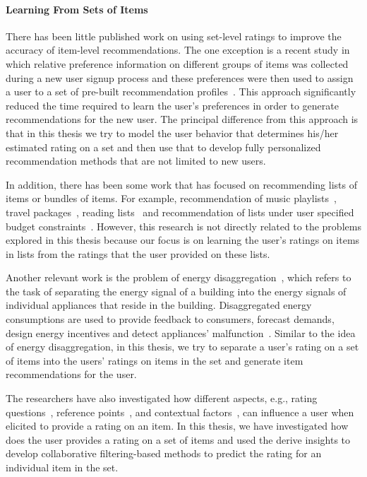 \paragraph{Learning From Sets of Items}
There has been little published work on using set-level ratings to improve the
accuracy of item-level recommendations. The one exception is a recent study in which relative
preference information on different groups of items was collected during a new user
signup process and these preferences were then used to assign a user to a set of
pre-built recommendation profiles~\cite{r53}. 
This approach significantly reduced the time required to learn the user's
preferences in order to generate recommendations for the new user.
The principal difference from this 
approach is that in this thesis we try to model the user behavior that determines
his/her estimated rating on a set and then use that to develop fully
personalized recommendation methods that are not limited to new users.

In addition, there has been some work that  has focused on recommending
lists of items or bundles of items. For example, recommendation of music
playlists~\cite{r55,moore2012learning,aizenberg2012build}, travel
packages~\cite{interdonato2013versatile,r54,liu2011personalized,xie2011comprec}, reading
lists~\cite{r56} and recommendation of lists under user specified budget
constraints~\cite{xie2010breaking,BenouaretRecsys16}.
However, this research is not directly related to the problems explored in this
thesis because our focus is on learning the user's ratings on items in lists from
the ratings that the user provided on these lists.

Another relevant work is the problem of energy disaggregation~\cite{hart1992nonintrusive}, 
which refers to the task
of separating the energy signal of a building into the energy signals of
individual appliances that reside in the building. Disaggregated energy
consumptions are used to provide feedback to consumers,  forecast demands,
design energy incentives and detect appliances'
malfunction~\cite{froehlich2011disaggregated,darby2006effectiveness}. Similar to
the idea of energy disaggregation, in this thesis, we try to separate a user's rating on a set of
items into the users' ratings on items in the set and generate item
recommendations for the user.

The researchers have also investigated how different aspects, e.g., rating
questions~\cite{bellogin2014magic}, reference
points~\cite{adomavicius2011recommender,cosley2003seeing,nguyen2013rating}, and
contextual factors~\cite{Winoto2010RUM}, can influence a user when
elicited to provide a rating on an item. In this thesis, we have investigated how
does the user provides a rating on a set of items and used the derive insights to develop
collaborative filtering-based methods to predict the rating for an individual
item in the set.









